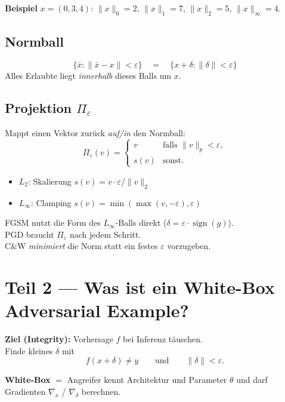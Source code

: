 \documentclass[11pt,a4paper]{article}
\newcommand{\eps}{\varepsilon}
\begin{document}
\textbf{Beispiel} $x=(0,3,4)$: $\|x\|_0=2$, $\|x\|_1=7$, $\|x\|_2=5$, $\|x\|_\infty=4$.

\subsection{Normball}
\[
\{\bar x : \|\bar x - x\| < \eps\}
\quad=\quad
\{x+\delta : \|\delta\| < \eps\}
\]
Alles Erlaubte liegt \emph{innerhalb} dieses Balls um $x$.

\subsection{Projektion $\Pi_\eps$}
Mappt einen Vektor zurück \emph{auf/in} den Normball:
\[
\Pi_\eps(v)
=
\begin{cases}
v & \text{falls }\|v\|_p < \eps,\\
s(v) & \text{sonst.}
\end{cases}
\]
\begin{itemize}
  \item $L_2$: Skalierung $s(v)=v\cdot\eps/\|v\|_2$
  \item $L_\infty$: Clamping $s(v)=\min(\max(v,-\eps),\eps)$
\end{itemize}

\begin{linkbox}
FGSM nutzt die Form des $L_\infty$-Balls direkt ($\delta=\eps\cdot\operatorname{sign}(g)$).\\
PGD braucht $\Pi_\eps$ nach jedem Schritt.\\
C\&W \emph{minimiert} die Norm statt ein festes $\eps$ vorzugeben.
\end{linkbox}

\section{Teil 2 --- Was ist ein White-Box Adversarial Example?}

\begin{formulabox}
\textbf{Ziel (Integrity):} Vorhersage $f$ bei Inferenz täuschen.\\[0.3em]
Finde kleines $\delta$ mit
\[
f(x+\delta)\neq y
\qquad\text{und}\qquad
\|\delta\|<\eps.
\]
\end{formulabox}

\textbf{White-Box} $=$ Angreifer kennt Architektur und Parameter $\theta$ und
darf Gradienten $\nabla_x$ / $\nabla_\delta$ berechnen.
\end{document}
